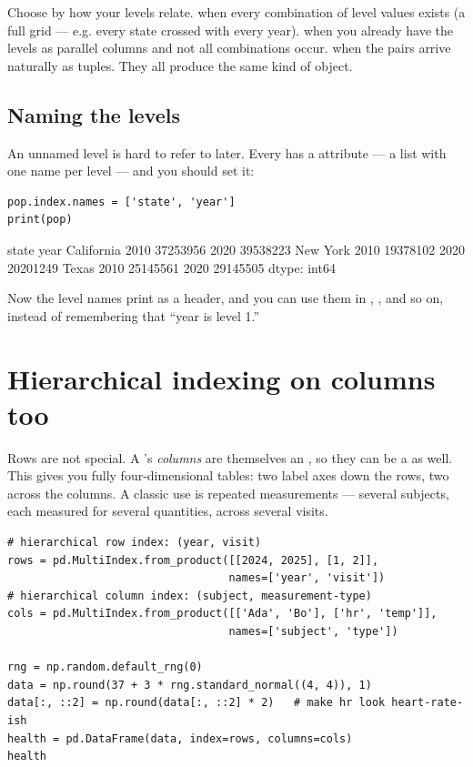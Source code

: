 \documentclass[11pt]{article}
\begin{document}
\begin{intuition}
Choose by how your levels relate.  when every combination of level values exists (a full grid --- e.g. every state crossed with every year).  when you already have the levels as parallel columns and not all combinations occur.  when the pairs arrive naturally as tuples. They all produce the same kind of object.
\end{intuition}

\subsection{Naming the levels}

An unnamed level is hard to refer to later. Every  has a  attribute --- a list with one name per level --- and you should set it:

\begin{lstlisting}
pop.index.names = ['state', 'year']
print(pop)
\end{lstlisting}

\begin{outblock}
state       year
California  2010    37253956
            2020    39538223
New York    2010    19378102
            2020    20201249
Texas       2010    25145561
            2020    29145505
dtype: int64
\end{outblock}

Now the level names print as a header, and you can use them in , , and so on, instead of remembering that ``year is level 1.''

\section{Hierarchical indexing on columns too}

Rows are not special. A 's \emph{columns} are themselves an , so they can be a  as well. This gives you fully four-dimensional tables: two label axes down the rows, two across the columns. A classic use is repeated measurements --- several subjects, each measured for several quantities, across several visits.

\begin{lstlisting}
# hierarchical row index: (year, visit)
rows = pd.MultiIndex.from_product([[2024, 2025], [1, 2]],
                                  names=['year', 'visit'])
# hierarchical column index: (subject, measurement-type)
cols = pd.MultiIndex.from_product([['Ada', 'Bo'], ['hr', 'temp']],
                                  names=['subject', 'type'])

rng = np.random.default_rng(0)
data = np.round(37 + 3 * rng.standard_normal((4, 4)), 1)
data[:, ::2] = np.round(data[:, ::2] * 2)   # make hr look heart-rate-ish
health = pd.DataFrame(data, index=rows, columns=cols)
health
\end{lstlisting}
\end{document}
